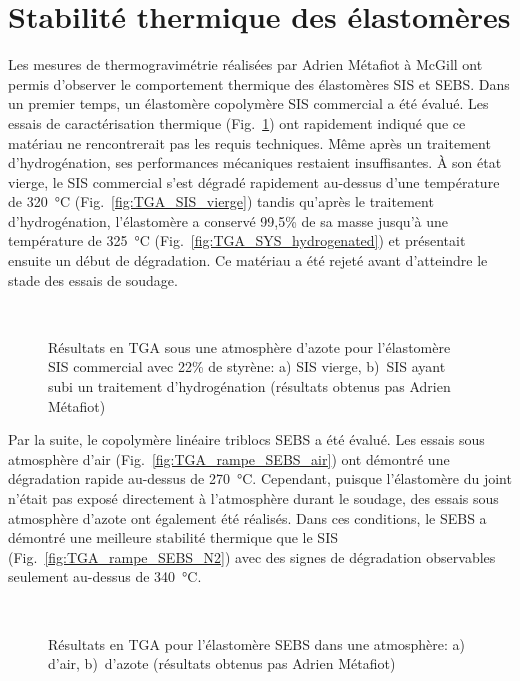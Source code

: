 \section*{Stabilité thermique des élastomères}

Les mesures de thermogravimétrie réalisées par Adrien Métafiot à McGill ont permis d'observer le comportement thermique des élastomères SIS et SEBS. 
Dans un premier temps, un élastomère copolymère SIS commercial a été évalué. 
Les essais de caractérisation thermique (Fig.~\ref{fig:TGA_SIS}) ont rapidement indiqué que ce matériau ne rencontrerait pas les requis techniques. 
Même après un traitement d'hydrogénation, ses performances mécaniques restaient insuffisantes. 
À son état vierge, le SIS commercial s'est dégradé rapidement au-dessus d'une température de \SI[locale=FR]{320}{\celsius} (Fig.~\ref{fig:TGA_SIS_vierge}) tandis qu'après le traitement d'hydrogénation, l'élastomère a conservé 99,5\% de sa masse jusqu'à une température de \SI[locale=FR]{325}{\celsius} (Fig.~\ref{fig:TGA_SYS_hydrogenated}) et présentait ensuite un début de dégradation.  
Ce matériau a été rejeté avant d'atteindre le stade des essais de soudage. 

\begin{figure}[h]
	\centering
	\\
	\caption{Résultats en TGA sous une atmosphère d'azote pour l'élastomère SIS commercial avec 22\% de styrène: a) SIS vierge, b)~SIS ayant subi un traitement d'hydrogénation (résultats obtenus pas Adrien Métafiot)}
	\label{fig:TGA_SIS}
\end{figure}

Par la suite, le copolymère linéaire triblocs SEBS a été évalué. 
Les essais sous atmosphère d'air (Fig.~\ref{fig:TGA_rampe_SEBS_air}) ont démontré une dégradation rapide au-dessus de \SI[locale=FR]{270}{\celsius}. 
Cependant, puisque l'élastomère du joint n'était pas exposé directement à l'atmosphère durant le soudage, des essais sous atmosphère d'azote ont également été réalisés. 
Dans ces conditions, le SEBS a démontré une meilleure stabilité thermique que le SIS (Fig.~\ref{fig:TGA_rampe_SEBS_N2}) avec des signes de dégradation observables seulement au-dessus de \SI[locale=FR]{340}{\celsius}. 

\begin{figure}[h]
	\centering
	\\
	\caption{Résultats en TGA pour l'élastomère SEBS dans une atmosphère: a) d'air, b)~d'azote (résultats obtenus pas Adrien Métafiot)}
	\label{fig:TGA_rampe_SEBS}
\end{figure}

